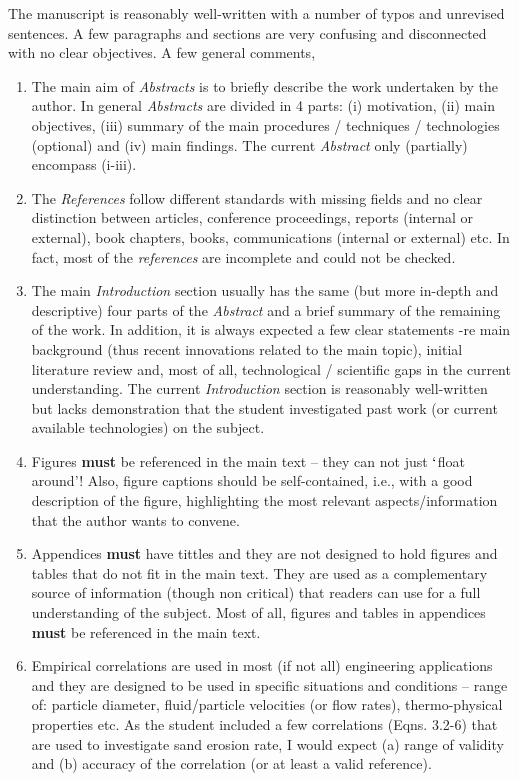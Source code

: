 \documentclass[14pt,twoside]{report}
\begin{document}
The manuscript is reasonably well-written with a number of typos and unrevised sentences. A few paragraphs and sections are very confusing and disconnected with no clear objectives. A few general comments,
\begin{enumerate}
%
\item The main aim of {\it Abstracts} is to briefly describe the work undertaken by the author. In general {\it Abstracts} are divided in 4 parts: (i) motivation, (ii) main objectives, (iii) summary of the main procedures / techniques / technologies (optional) and (iv) main findings. The current {\it Abstract} only (partially) encompass (i-iii).
%
\item The {\it References} follow different standards with missing fields and no clear distinction between articles, conference proceedings, reports (internal or external), book chapters, books, communications (internal or external) etc.  In fact, most of the {\it references} are incomplete and could not be checked.  
%
\item The main {\it Introduction} section usually has the same (but more in-depth and descriptive) four parts of the {\it Abstract} and a brief summary of the remaining of the work. In addition, it is always expected a few clear statements -re main background (thus recent innovations related to the main topic), initial literature review and, most of all, technological / scientific gaps in the current understanding. The current {\it Introduction} section is reasonably well-written but lacks demonstration that the student investigated past work (or current available technologies) on the subject.
%
\item Figures {\bf must} be referenced in the main text -- they can not just $\lq$float around'! Also, figure captions should be self-contained, i.e., with a good description of the figure, highlighting the most relevant aspects/information that the author wants to convene. 
%
\item Appendices {\bf must} have tittles and they are not designed to hold figures and tables that do not fit in the main text. They are used as a complementary source of information (though non critical) that readers can use for a full understanding of the subject. Most of all, figures and tables in appendices {\bf must} be referenced in the main text. 
%
\item Empirical correlations are used in most (if not all) engineering applications and they are designed to be used in specific situations and conditions -- range of: particle diameter, fluid/particle velocities (or flow rates), thermo-physical properties etc. As the student included a few correlations (Eqns. 3.2-6) that are used to investigate sand erosion rate, I would expect (a) range of validity and  (b) accuracy of the correlation (or at least a valid reference).

\end{enumerate}
\end{document}
